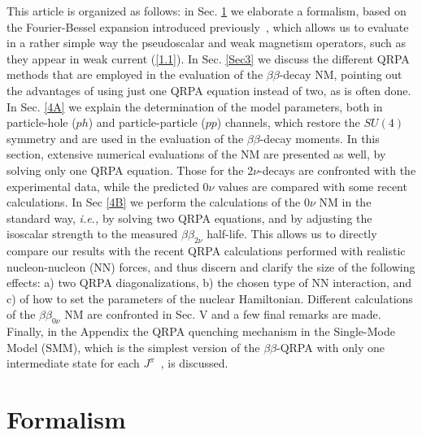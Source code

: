 \documentclass[nofootinbib,twocolumn,eqsecnum,floats,aps]{revtex4}
\def\ie{{\it i.e., }}
\def\rf#1{{(\ref{#1})}}
\def\b {{\beta}}
\begin{document}
This article is organized as follows: in Sec. \ref{Sec2} we elaborate a
formalism,  based on the Fourier-Bessel expansion introduced
previously~\cite{Krm94,Krm94a, Bar98,Bar99,Bar99a}, which allows
us to evaluate in a rather simple way  the pseudoscalar and weak
magnetism operators, such as they appear in weak current \rf{1.1}.
 In Sec. \ref{Sec3}  we discuss the different QRPA methods that
are employed in the evaluation of the $\beta\beta$-decay NM,  pointing out the advantages of using just one QRPA equation instead of two, as is often done.
 In Sec. \ref{4A}  we explain  the determination of the model parameters,
both in particle-hole ($ph$) and particle-particle ($pp$) channels,
which restore the $SU(4)$ symmetry and are used in the evaluation of
the $\b\b$-decay moments. In this section, extensive numerical evaluations of the NM are presented as well,  by solving only one QRPA equation.
Those for the $2\nu$-decays are confronted with the experimental data, while the predicted $0\nu$  values are
compared with some recent calculations.
In Sec \ref{4B} we
perform the  calculations of the $0\nu$ NM in  the  standard way, \ie by solving two QRPA equations, and by adjusting the
 isoscalar strength to the measured $\b\b_{2\nu}$ half-life.
This allows us to directly compare our results with the recent QRPA calculations performed with realistic nucleon-nucleon (NN) forces, and thus discern and clarify the size of the following effects:
a) two QRPA diagonalizations, b) the chosen type of NN interaction,
and c) of how to set the parameters of the nuclear Hamiltonian.
Different calculations of the  $\b\b_{0\nu}$ NM are confronted in Sec. V and a few final remarks are made.
 Finally, in the Appendix
the QRPA quenching mechanism in the
Single-Mode Model (SMM), which is the simplest
version of the $\b\b$-QRPA with only one intermediate state for each
$J^\pi$~\cite{Hir90a,Krm94a}, is discussed.



\section{ Formalism}\label{Sec2}
\end{document}
